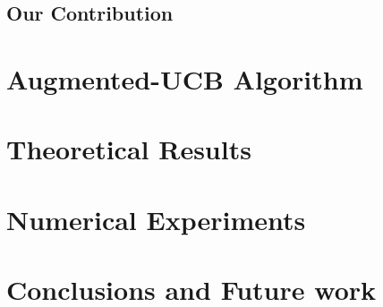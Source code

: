 \documentclass{article}
\begin{document}
\subsection{Our Contribution}
\label{contribution}

%
%
%
%
\section{Augmented-UCB Algorithm}
\label{algorithm}

%
\section{Theoretical Results}
\label{results}

%
%
\section{Numerical Experiments}
\label{expt}



\section{Conclusions and Future work}
\label{conclusion}



\clearpage
\newpage



%
\end{document}
